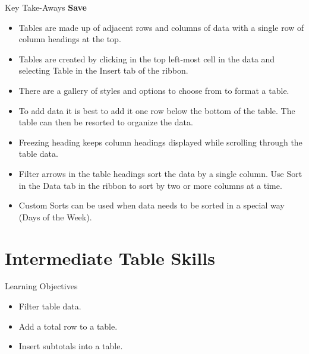 \begin{center}
	\begin{tkwbox}{Key Take-Aways}
		\textbf{Save}
		\\
		\begin{itemize}
			\setlength{\itemsep}{0pt}
			\setlength{\parskip}{0pt}
			\setlength{\parsep}{0pt}

			\item Tables are made up of adjacent rows and columns of data with a single row of column headings at the top.
			\item Tables are created by clicking in the top left-most cell in the data and selecting Table in the Insert tab of the ribbon.
			\item There are a gallery of styles and options to choose from to format a table.
			\item To add data it is best to add it one row below the bottom of the table. The table can then be resorted to organize the data.
			\item Freezing heading keeps column headings displayed while scrolling through the table data.
			\item Filter arrows in the table headings sort the data by a single column. Use Sort in the Data tab in the ribbon to sort by two or more columns at a time.
			\item Custom Sorts can be used when data needs to be sorted in a special way (\ie Days of the Week).
			
		\end{itemize}
	\end{tkwbox}
\end{center}

\section{Intermediate Table Skills}

\begin{center}
	\begin{objbox}{Learning Objectives}
		\begin{itemize}
			\setlength{\itemsep}{0pt}
			\setlength{\parskip}{0pt}
			\setlength{\parsep}{0pt}

			\item Filter table data.
			\item Add a total row to a table.
			\item Insert subtotals into a table.
			
		\end{itemize}
	\end{objbox}
\end{center}

